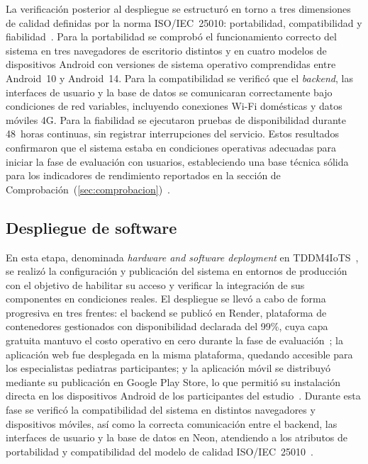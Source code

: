 				La verificación posterior al despliegue se estructuró en torno a tres dimensiones de calidad definidas por la norma ISO/IEC~25010: portabilidad, compatibilidad y fiabilidad~\cite{GuerreroUlloa2024}. Para la portabilidad se comprobó el funcionamiento correcto del sistema en tres navegadores de escritorio distintos y en cuatro modelos de dispositivos Android con versiones de sistema operativo comprendidas entre Android~10 y Android~14. Para la compatibilidad se verificó que el \textit{backend}, las interfaces de usuario y la base de datos se comunicaran correctamente bajo condiciones de red variables, incluyendo conexiones Wi-Fi domésticas y datos móviles 4G. Para la fiabilidad se ejecutaron pruebas de disponibilidad durante 48~horas continuas, sin registrar interrupciones del servicio. Estos resultados confirmaron que el sistema estaba en condiciones operativas adecuadas para iniciar la fase de evaluación con usuarios, estableciendo una base técnica sólida para los indicadores de rendimiento reportados en la sección de Comprobación~(\ref{sec:comprobacion})~\cite{Pressman2019}.
				
			\subsection{Despliegue de software}
			\label{sec:softdep}
				En esta etapa, denominada \textit{hardware and software deployment} en TDDM4IoTS~\cite{GuerreroUlloa2024}, se realizó la configuración y publicación del sistema en entornos de producción con el objetivo de habilitar su acceso y verificar la integración de sus componentes en condiciones reales. El despliegue se llevó a cabo de forma progresiva en tres frentes: el backend se publicó en Render, plataforma de contenedores gestionados con disponibilidad declarada del 99\%, cuya capa gratuita mantuvo el costo operativo en cero durante la fase de evaluación~\cite{Kleppmann2017}; la aplicación web fue desplegada en la misma plataforma, quedando accesible para los especialistas pediatras participantes; y la aplicación móvil se distribuyó mediante su publicación en Google Play Store, lo que permitió su instalación directa en los dispositivos Android de los participantes del estudio~\cite{GuerreroUlloa2024}. Durante esta fase se verificó la compatibilidad del sistema en distintos navegadores y dispositivos móviles, así como la correcta comunicación entre el backend, las interfaces de usuario y la base de datos en Neon, atendiendo a los atributos de portabilidad y compatibilidad del modelo de calidad ISO/IEC~25010~\cite{GuerreroUlloa2024}.
				
